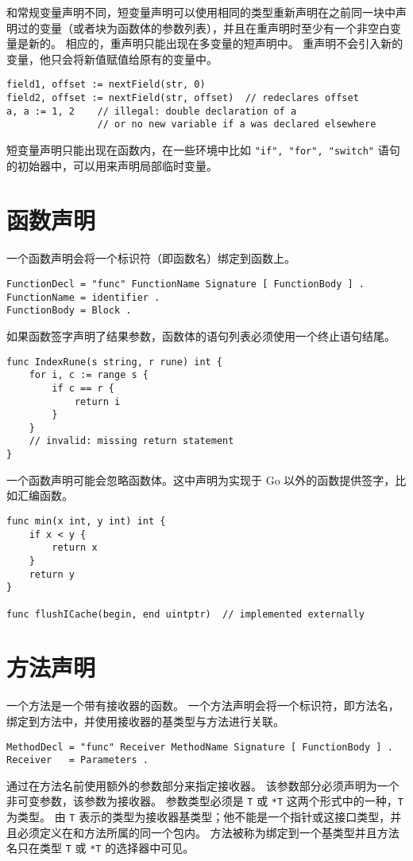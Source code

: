 和常规变量声明不同，短变量声明可以使用相同的类型重新声明在之前同一块中声明过的变量（或者块为函数体的参数列表），并且在重声明时至少有一个非空白变量是新的。
相应的，重声明只能出现在多变量的短声明中。
重声明不会引入新的变量，他只会将新值赋值给原有的变量中。
\begin{lstlisting}
field1, offset := nextField(str, 0)
field2, offset := nextField(str, offset)  // redeclares offset
a, a := 1, 2	// illegal: double declaration of a 
				// or no new variable if a was declared elsewhere
\end{lstlisting}

短变量声明只能出现在函数内，在一些环境中比如 \lstinline|"if", "for", "switch"| 语句的初始器中，可以用来声明局部临时变量。


\section{函数声明}
一个函数声明会将一个标识符（即函数名）绑定到函数上。
\begin{lstlisting}[style=EBNF]
FunctionDecl = "func" FunctionName Signature [ FunctionBody ] .
FunctionName = identifier .
FunctionBody = Block .
\end{lstlisting}
如果函数签字声明了结果参数，函数体的语句列表必须使用一个终止语句结尾。
\begin{lstlisting}[style=golang]
func IndexRune(s string, r rune) int {
	for i, c := range s {
		if c == r {
			return i
		}
	}
	// invalid: missing return statement
}
\end{lstlisting}

一个函数声明可能会忽略函数体。这中声明为实现于 Go 以外的函数提供签字，比如汇编函数。
\begin{lstlisting}[style=golang]
func min(x int, y int) int {
	if x < y {
		return x
	}
	return y
}

func flushICache(begin, end uintptr)  // implemented externally
\end{lstlisting} 

\section{方法声明}
一个方法是一个带有接收器的函数。
一个方法声明会将一个标识符，即方法名，绑定到方法中，并使用接收器的基类型与方法进行关联。
\begin{lstlisting}[style=golang]
MethodDecl = "func" Receiver MethodName Signature [ FunctionBody ] .
Receiver   = Parameters .
\end{lstlisting}
通过在方法名前使用额外的参数部分来指定接收器。
该参数部分必须声明为一个非可变参数，该参数为接收器。
参数类型必须是 \lstinline|T| 或 \lstinline|*T| 这两个形式中的一种，\lstinline|T| 为类型。
由 \lstinline|T| 表示的类型为接收器基类型；他不能是一个指针或这接口类型，并且必须定义在和方法所属的同一个包内。
方法被称为绑定到一个基类型并且方法名只在类型 \lstinline|T| 或 \lstinline|*T| 的选择器中可见。

